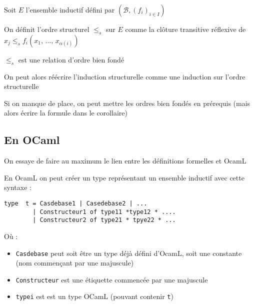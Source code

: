 \begin{definition}
	Soit $E$ l'ensemble inductif défini par $(\mathcal B, (f_i)_{i \in I})$
	
	On définit l'ordre structurel $\leq_s$ sur $E$ comme la clôture transitive réflexive de $x_j \leq_s f_i(x_1, \, \dots, \, x_{\alpha(i)})$
\end{definition}

\begin{proposition}
	$\leq_s$ est une relation d'ordre bien fondé
\end{proposition}

\begin{corollary}
	On peut alors réécrire l'induction structurelle comme une induction sur l'ordre structurelle
\end{corollary}

\begin{com}
	Si on manque de place, on peut mettre les ordres bien fondés en prérequis (mais alors écrire la formule dans le corollaire)
\end{com}

\subsection{En OCaml}

\begin{com}
	On essaye de faire au maximum le lien entre les définitions formelles et OcamL
\end{com}

\begin{syntaxe}
	En OcamL on peut créer un type représentant un ensemble inductif avec cette syntaxe :
	\begin{lstlisting}
type  t = Casdebase1 | Casedebase2 | ... 
        | Constructeur1 of type11 *type12 * .... 
        | Constructeur2 of type21 * tpye22 * ...
	\end{lstlisting}
	
	Où : \begin{itemize}
		\item \texttt{Casdebase} peut soit être un type déjà défini d'OcamL, soit une constante (nom commençant par une majuscule)
		\item \texttt{Constructeur} est une étiquette commencée par une majuscule 
		\item \texttt{typei} est est un type OCamL (pouvant contenir \texttt t)
	\end{itemize}
\end{syntaxe}

